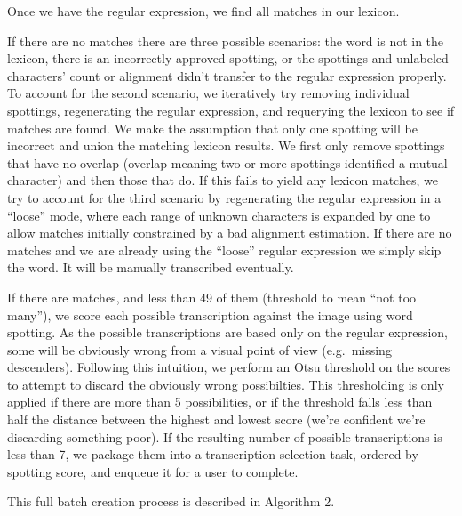 \documentclass[ms,electronic,twosidetoc,letterpaper,chaptercenter,parttop,lof,lot]{byumsphd}
\begin{document}
Once we have the regular expression, we find all matches in our lexicon.

If there are no matches there are three possible scenarios: the word is not in the lexicon, there is an incorrectly approved spotting, or the spottings and unlabeled characters' count or alignment didn't transfer to the regular expression properly.
To account for the second scenario, we iteratively try removing individual spottings, regenerating the regular expression, and requerying the lexicon to see if matches are found. We make the assumption that only one spotting will be incorrect and union the matching lexicon results. We first only remove spottings that have no overlap (overlap meaning two or more spottings identified a mutual character) and then those that do.
If this fails to yield any lexicon matches, we try to account for the third scenario by regenerating the regular expression in a ``loose'' mode, where each range of unknown characters is expanded by one to allow matches initially constrained by a bad alignment estimation.
If there are no matches and we are already using the ``loose'' regular expression we simply skip the word. It will be manually transcribed eventually.

If there are matches, and less than 49 of them (threshold to mean ``not too many''), we score each possible transcription against the image using word spotting.
As the possible transcriptions are based only on the regular expression, some will be obviously wrong from a visual point of view (e.g.~missing descenders). Following this intuition, we perform an Otsu threshold on the scores to attempt to discard the obviously wrong possibilties. This thresholding is only applied if there are more than 5 possibilities, or if the threshold falls less than half the distance between the highest and lowest score (we're confident we're discarding something poor).
If the resulting number of possible transcriptions is less than 7, we package them into a transcription selection task, ordered by spotting score, and enqueue it for a user to complete.

This full batch creation process is described in Algorithm 2.
\end{document}
